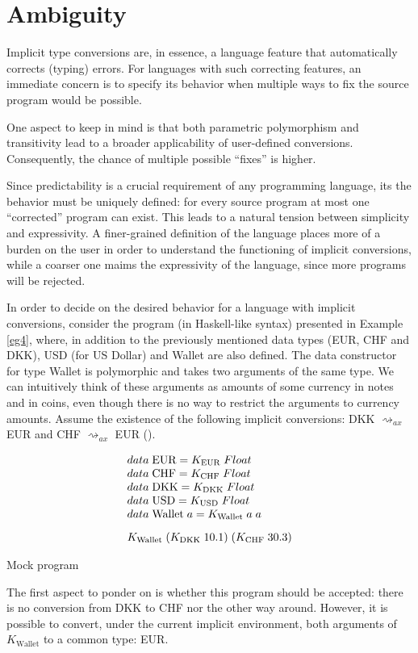 \section{Ambiguity}
\label{ambiguity}
Implicit type conversions are, in essence, a language feature that automatically corrects (typing) errors. For languages with such correcting features, an immediate concern is to specify its behavior when multiple ways to fix the source program would be possible. 

One aspect to keep in mind is that both parametric polymorphism and transitivity lead to a broader applicability of user-defined conversions. Consequently, the chance of multiple possible ``fixes'' is higher.

Since predictability is a crucial requirement of any programming language, its the behavior must be uniquely defined: for every source program at most one ``corrected'' program can exist. This leads to a natural tension between simplicity and expressivity. A finer-grained definition of the language places more of a burden on the user in order to understand the functioning of implicit conversions, while a coarser one maims the expressivity of the language, since more programs will be rejected.

In order to decide on the desired behavior for a language with implicit conversions, consider the program (in Haskell-like syntax) presented in Example \ref{eg4}, where, in addition to the previously mentioned data types (EUR, CHF and DKK), USD (for US Dollar) and Wallet are also defined. The data constructor for type Wallet is polymorphic and takes two arguments of the same type. We can intuitively think of these arguments as amounts of some currency in notes and in coins, even though there is no way to restrict the arguments to currency amounts. Assume the existence of the following implicit conversions: DKK $\rightsquigarrow_{ax}$ EUR and CHF $\rightsquigarrow_{ax}$ EUR ().
 \begin{eg}
\[
\begin{array}{@{\hspace{0mm}}l@{\hspace{0mm}}}
data\;\text{EUR}=K_{\text{EUR}}\;Float\\
data\;\text{CHF}=K_{\text{CHF}}\;Float\\
data\;\text{DKK}=K_{\text{DKK}}\;Float\\
data\;\text{USD}=K_{\text{USD}}\;Float\\
data\;\text{Wallet}\;a = K_{\text{Wallet}} \;a \;a\\[3mm]
K_{\text{Wallet}}\;(K_{\text{DKK}}\;10.1)\;(K_{\text{CHF}}\;30.3)
\end{array}
\]
\label{eg4}
\caption{Mock program}
\end{eg}
The first aspect to ponder on is whether this program should be accepted: there is no conversion from DKK to CHF nor the other way around. However, it is possible to convert, under the current implicit environment, both arguments of $K_{\text{Wallet}}$ to a common type: EUR. 

